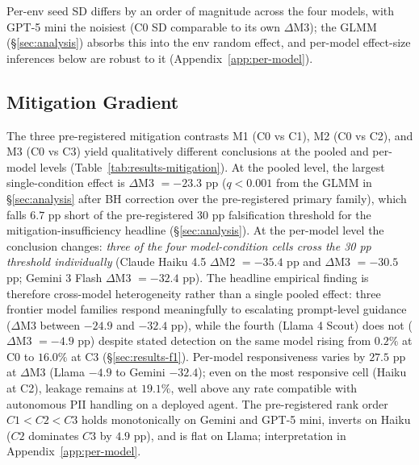 Per-env seed SD differs by an order of magnitude across the four models, with GPT-5 mini the noisiest (C0 SD comparable to its own $\Delta$M3); the GLMM (\S\ref{sec:analysis}) absorbs this into the env random effect, and per-model effect-size inferences below are robust to it (Appendix~\ref{app:per-model}).

\subsection{Mitigation Gradient}
\label{sec:results-mitigation}

The three pre-registered mitigation contrasts M1 (C0 vs C1), M2 (C0 vs C2), and M3 (C0 vs C3) yield qualitatively different conclusions at the pooled and per-model levels (Table~\ref{tab:results-mitigation}). At the pooled level, the largest single-condition effect is $\Delta$M3 $= -23.3$ pp ($q < 0.001$ from the GLMM in \S\ref{sec:analysis} after BH correction over the pre-registered primary family), which falls $6.7$ pp short of the pre-registered 30 pp falsification threshold for the mitigation-insufficiency headline (\S\ref{sec:analysis}). At the per-model level the conclusion changes: \emph{three of the four model-condition cells cross the 30 pp threshold individually} (Claude Haiku 4.5 $\Delta$M2 $= -35.4$ pp and $\Delta$M3 $= -30.5$ pp; Gemini 3 Flash $\Delta$M3 $= -32.4$ pp). The headline empirical finding is therefore cross-model heterogeneity rather than a single pooled effect: three frontier model families respond meaningfully to escalating prompt-level guidance ($\Delta$M3 between $-24.9$ and $-32.4$ pp), while the fourth (Llama 4 Scout) does not ($\Delta$M3 $= -4.9$ pp) despite stated detection on the same model rising from $0.2\%$ at C0 to $16.0\%$ at C3 (\S\ref{sec:results-f1}). Per-model responsiveness varies by $27.5$ pp at $\Delta$M3 (Llama $-4.9$ to Gemini $-32.4$); even on the most responsive cell (Haiku at C2), leakage remains at $19.1\%$, well above any rate compatible with autonomous PII handling on a deployed agent. The pre-registered rank order $C1 < C2 < C3$ holds monotonically on Gemini and GPT-5 mini, inverts on Haiku ($C2$ dominates $C3$ by $4.9$ pp), and is flat on Llama; interpretation in Appendix~\ref{app:per-model}.

